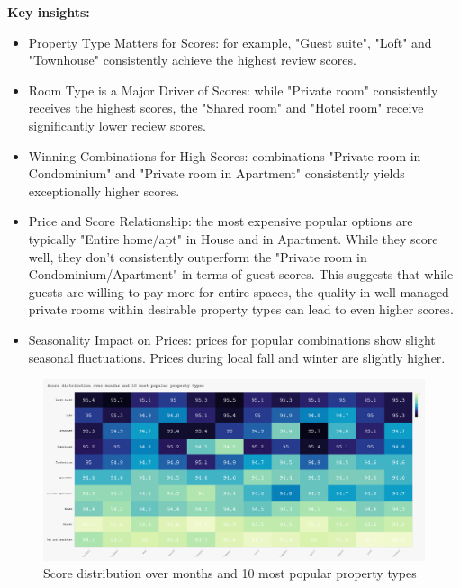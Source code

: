 \vspace{0.5em}
\textbf{Key insights:}
\begin{itemize}
    \item Property Type Matters for Scores: for example, "Guest suite", "Loft" and "Townhouse" consistently achieve the highest review scores.
    \item Room Type is a Major Driver of Scores: while "Private room" consistently receives the highest scores, the "Shared room" and "Hotel room" receive significantly lower reciew scores.
    \item Winning Combinations for High Scores: combinations "Private room in Condominium" and "Private room in Apartment" consistently yields exceptionally higher scores.
    \item Price and Score Relationship: the most expensive popular options are typically "Entire home/apt" in House and in Apartment. While they score well, they don't consistently outperform the "Private room in Condominium/Apartment" in terms of guest scores. This suggests that while guests are willing to pay more for entire spaces, the quality in well-managed private rooms within desirable property types can lead to even higher scores.
    \item Seasonality Impact on Prices: prices for popular combinations show slight seasonal fluctuations. Prices during local fall and winter are slightly higher.
    
\end{itemize}

\vspace{1em}
\begin{figure}[H]
    \centering
    \includegraphics[width=1\textwidth]{images/q4_1.jpg}
    \caption{Score distribution over months and 10 most popular property types}
    \label{fig:figureq5}
\end{figure}

